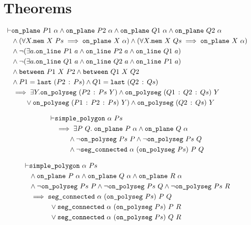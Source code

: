 \section{Theorems}
\begin{align*}
\vdash &\code{on\_plane}\ P1\ \alpha \wedge \code{on\_plane}\ P2\ \alpha \wedge \code{on\_plane}\ Q1\ \alpha \wedge \code{on\_plane}\ Q2\ \alpha\\
       &\wedge(\forall X. \code{mem}\ X\ Ps \implies \code{on\_plane}\ X\ \alpha) \wedge (\forall X. \code{mem}\ X\ Qs \implies \code{on\_plane}\ X\ \alpha)\\
       &\wedge\Triangle{a}{P1}{P2}{Q1}\\
       &\wedge\Triangle{a}{Q1}{Q2}{P1}\\
       &\wedge\code{between}\ P1\ X\ P2 \wedge \code{between}\ Q1\ X\ Q2\\
       &\wedge P1 = \code{last}\ (\cons{P2}{Ps}) \wedge Q1 = \code{last}\ (\cons{Q2}{Qs})\\
       &\implies \exists Y. \code{on\_polyseg}\ (\cons{P2}{Ps}\ Y) \wedge \code{on\_polyseg}\ (\cons{Q1}{\cons{Q2}{Qs}})\ Y\\
       &\qquad\vee \code{on\_polyseg}\ (\cons{P1}{\cons{P2}{Ps}})\ Y) \wedge \code{on\_polyseg}\ (\cons{Q2}{Qs})\ Y
\end{align*}

\begin{align*}
\vdash &\code{simple\_polygon}\ \alpha\ Ps\\
       &\implies \exists P\ Q.\; \code{on\_plane}\ P\ \alpha \wedge \code{on\_plane}\ Q\ \alpha\\
       &\qquad\wedge \neg\code{on\_polyseg}\ Ps\ P \wedge \neg\code{on\_polyseg}\ Ps\ Q\\
       &\qquad\wedge \neg\code{seg\_connected}\ \alpha\ (\code{on\_polyseg}\ Ps)\ P\ Q
\end{align*}

\begin{align*}
\vdash &\code{simple\_polygon}\ \alpha\ Ps\\
       &\wedge \code{on\_plane}\ P\ \alpha \wedge \code{on\_plane}\ Q\ \alpha \wedge \code{on\_plane}\ R\ \alpha\\
       &\wedge \neg\code{on\_polyseg}\ Ps\ P\wedge \neg\code{on\_polyseg}\ Ps\ Q\wedge \neg\code{on\_polyseg}\ Ps\ R\\
       &\implies \code{seg\_connected}\ \alpha\ (\code{on\_polyseg}\ Ps)\ P\ Q\\
       &\qquad\quad\vee \code{seg\_connected}\ \alpha\ (\code{on\_polyseg}\ Ps)\ P\ R\\
       &\qquad\quad\vee \code{seg\_connected}\ \alpha\ (\code{on\_polyseg}\ Ps)\ Q\ R
\end{align*}


